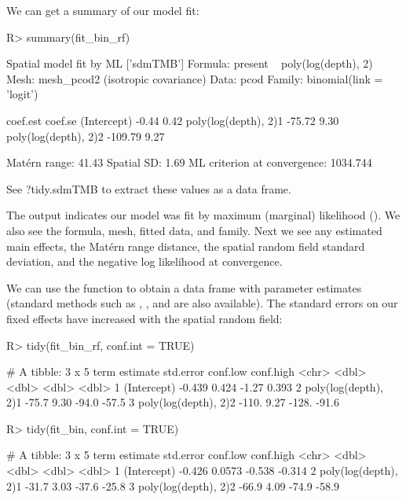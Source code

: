 \documentclass[article]{jss}\usepackage[]{graphicx}\usepackage[dvipsnames]{xcolor}
\newcommand{\fct}[1]{\code{#1()}}
\begin{document}
We can get a summary of our model fit:

\begin{Schunk}
\begin{Sinput}
R> summary(fit_bin_rf)
\end{Sinput}
\begin{Soutput}
Spatial model fit by ML ['sdmTMB']
Formula: present ~ poly(log(depth), 2)
Mesh: mesh_pcod2 (isotropic covariance)
Data: pcod
Family: binomial(link = 'logit')
 
                     coef.est coef.se
(Intercept)             -0.44    0.42
poly(log(depth), 2)1   -75.72    9.30
poly(log(depth), 2)2  -109.79    9.27

Matérn range: 41.43
Spatial SD: 1.69
ML criterion at convergence: 1034.744

See ?tidy.sdmTMB to extract these values as a data frame.
\end{Soutput}
\end{Schunk}

The output indicates our model was fit by maximum (marginal) likelihood ().
We also see the formula, mesh, fitted data, and family.
Next we see any estimated main effects, the Matérn range distance, the spatial random field standard deviation, and the negative log likelihood at convergence.

We can use the \fct{tidy} function to obtain a data frame with parameter estimates (standard methods such as \fct{fixef}, \fct{confint}, and \fct{vcov} are also available).
The standard errors on our fixed effects have increased with the spatial random field:

\begin{Schunk}
\begin{Sinput}
R> tidy(fit_bin_rf, conf.int = TRUE)
\end{Sinput}
\begin{Soutput}
# A tibble: 3 x 5
  term                 estimate std.error conf.low conf.high
  <chr>                   <dbl>     <dbl>    <dbl>     <dbl>
1 (Intercept)            -0.439     0.424    -1.27     0.393
2 poly(log(depth), 2)1  -75.7       9.30    -94.0    -57.5  
3 poly(log(depth), 2)2 -110.        9.27   -128.     -91.6  
\end{Soutput}
\begin{Sinput}
R> tidy(fit_bin, conf.int = TRUE)
\end{Sinput}
\begin{Soutput}
# A tibble: 3 x 5
  term                 estimate std.error conf.low conf.high
  <chr>                   <dbl>     <dbl>    <dbl>     <dbl>
1 (Intercept)            -0.426    0.0573   -0.538    -0.314
2 poly(log(depth), 2)1  -31.7      3.03    -37.6     -25.8  
3 poly(log(depth), 2)2  -66.9      4.09    -74.9     -58.9  
\end{Soutput}
\end{Schunk}
\end{document}
